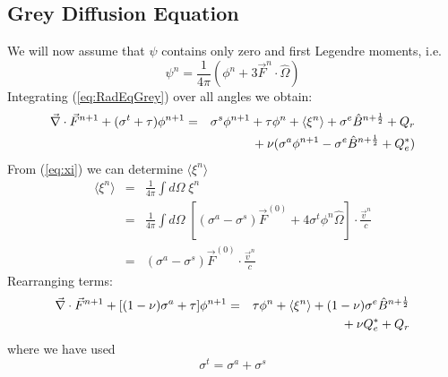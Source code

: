 \documentclass[12pt]{article}
\newcommand{\Bnphlf}{\ensuremath{\hat{B}^{n+\frac{1}{2}}}}
\begin{document}
\subsection{Grey Diffusion Equation}

We will now assume that $\psi$ contains only zero and first Legendre moments,
i.e.\ 
\begin{equation}
        \psi^{n} = \frac{1}{4\pi} \left(
                        \phi^{n} + 3 \vec{F}^{n} \cdot \hat{\Omega}
                   \right)
\end{equation}
Integrating (\ref{eq:RadEqGrey}) over all angles
we obtain:
\begin{eqnarray}
\del \cdot \vec{F}^{n+1} + (\sigma^{t} + \tau) \phi^{n+1}
        &=& \sigma^{s}\phi^{n+1} + \tau \phi^{n}
        + \langle \xi^{n} \rangle
        + \sigma^{e} \Bnphlf  + Q_{r}
        \nonumber \\
        & & \mbox{}
        + \nu (\sigma^{a}\phi^{n+1} - \sigma^{e}\Bnphlf + Q_{e}^{*})
\end{eqnarray}
From (\ref{eq:xi}) we can determine $\langle \xi^{n} \rangle$
\begin{eqnarray}
        \langle \xi^{n} \rangle &=&
                \frac{1}{4\pi} \int d\Omega \; \xi^{n}
                \\
                &=& \frac{1}{4\pi} \int d\Omega \;
                    \left[ (\sigma^{a} - \sigma^{s}) \vec{F}^{(0)}
                        + 4 \sigma^{t} \phi^{n} \hat{\Omega} \right]
                                \cdot \frac{\vec{v}^{n}}{c}
                \\
                 &=& (\sigma^{a} - \sigma^{s}) \vec{F}^{(0)}
                        \cdot \frac{\vec{v}^{n}}{c}
\label{eq:l_xi_r}
\end{eqnarray}
Rearranging terms:
\begin{eqnarray}
\del \cdot \vec{F}^{n+1} + [(1 - \nu) \sigma^{a} + \tau ] \phi^{n+1}
        &=& \tau \phi^{n}
        + \langle \xi^{n} \rangle
        + (1 - \nu) \sigma^{e} \Bnphlf  
        \nonumber \\
        & & \mbox{}
        + \nu Q_{e}^{*} + Q_{r}
\label{eq:phiEq}
\end{eqnarray}
where we have used
\begin{equation}
        \sigma^{t} = \sigma^{a} + \sigma^{s}
\end{equation}
\end{document}
